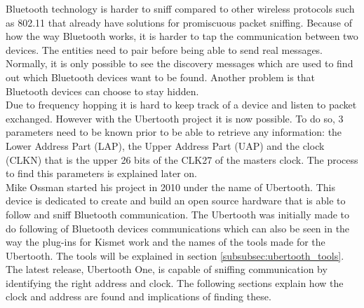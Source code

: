 \label{subsubsec:ubertooth}
Bluetooth technology is harder to sniff compared to other wireless protocols such as 802.11 that already have solutions for promiscuous packet sniffing. Because of how the way Bluetooth works, it is harder to tap the communication between two devices. The entities need to pair before being able to send real messages. Normally, it is only possible to see the discovery messages which are used to find out which Bluetooth devices want to be found. Another problem is that Bluetooth devices can choose to stay hidden. \\
Due to frequency hopping it is hard to keep track of a device and listen to packet exchanged. However with the Ubertooth project \cite{Ubertooth} it is now possible. To do so, 3 parameters need to be known prior to be able to retrieve any information: the Lower Address Part (LAP), the Upper Address Part (UAP) and the clock (CLKN) that is the upper 26 bits of the CLK27 of the masters clock. The process to find this parameters is explained later on.
\\
Mike Ossman started his project \cite{Ubertooth} in 2010 under the name of Ubertooth. This device is dedicated to create and build an open source hardware that is able to follow and sniff Bluetooth communication. The Ubertooth was initially made to do following of Bluetooth devices communications which can also be seen in the way the plug-ins for Kismet work and the names of the tools made for the Ubertooth. The tools will be explained in section \ref{subsubsec:ubertooth_tools}. The latest release, Ubertooth One, is capable of sniffing communication by identifying the right address and clock. The following sections explain how the clock and address are found and implications of finding these.

